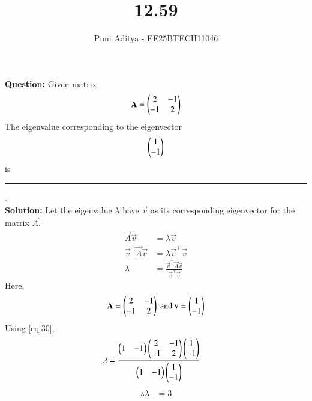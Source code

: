 \documentclass[journal]{IEEEtran}
\begin{document}
\title{12.59}
\author{Puni Aditya - EE25BTECH11046}
\maketitle

\textbf{Question:}
Given matrix
\begin{align*}
    \mathbf{A} = \begin{pmatrix}2 & -1 \\ -1 & 2\end{pmatrix}
\end{align*}
The eigenvalue corresponding to the eigenvector
\begin{align*}
    \begin{pmatrix}1 \\ -1\end{pmatrix}
\end{align*}
is \rule{2cm}{0.4pt}. \\

\textbf{Solution:}
Let the eigenvalue $\lambda$ have $\vec{v}$ as its corresponding eigenvector for the matrix $\vec{A}$.
\begin{align}
    \vec{A}\vec{v} &= \lambda\vec{v} \\
    \vec{v}^\top\vec{A}\vec{v} &= \lambda\vec{v}^\top\vec{v} \\
    \lambda &= \frac{\vec{v}^\top\vec{A}\vec{v}}{\vec{v}^\top\vec{v}} \label{eq:30}
\end{align}
Here,
\begin{align}
    \mathbf{A} = \begin{pmatrix}2 & -1 \\ -1 & 2\end{pmatrix}\text{ and }\mathbf{v} = \begin{pmatrix}1 \\ -1\end{pmatrix}
\end{align}
Using \eqref{eq:30},
\begin{align}
    \lambda &= \frac{\begin{pmatrix}1 & -1\end{pmatrix}\begin{pmatrix}2 & -1 \\ -1 & 2\end{pmatrix}\begin{pmatrix}1 \\ -1\end{pmatrix}}{\begin{pmatrix}1 & -1\end{pmatrix}\begin{pmatrix}1 \\ -1\end{pmatrix}}
\end{align}
\begin{align}
    \therefore \lambda &= 3
\end{align}
\end{document}
